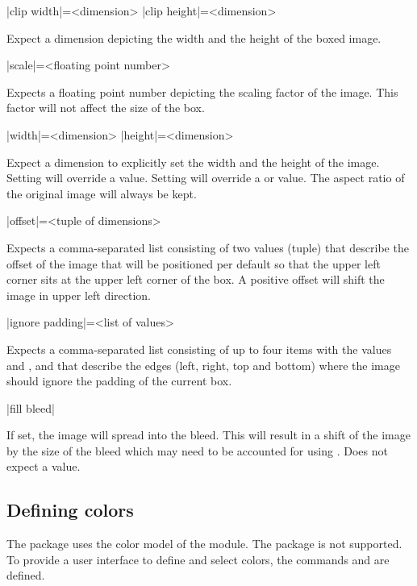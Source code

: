 \documentclass[a4paper]{article}
\begin{document}
\begin{macrodef}
|clip width|={<dimension>}
|clip height|={<dimension>}
\end{macrodef}
Expect a dimension depicting the width and the height of the boxed image.

\begin{macrodef}
|scale|={<floating point number>}
\end{macrodef}
Expects a floating point number depicting the scaling factor of the image. This factor will not affect the size of the box.

\begin{macrodef}
|width|={<dimension>}
|height|={<dimension>}
\end{macrodef}
Expect a dimension to explicitly set the width and the height of the image. Setting  will override a  value. Setting  will override a  or  value. The aspect ratio of the original image will always be kept.

\begin{macrodef}
|offset|={<tuple of dimensions>}
\end{macrodef}
Expects a comma-separated list consisting of two values (tuple) that describe the offset of the image that will be positioned per default so that the upper left corner sits at the upper left corner of the box. A positive offset will shift the image in upper left direction.

\begin{macrodef}
|ignore padding|={<list of values>}
\end{macrodef}
Expects a comma-separated list consisting of up to four items with the values  and ,  and  that describe the edges (left, right, top and bottom) where the image should ignore the padding of the current box.

\begin{macrodef}
|fill bleed|
\end{macrodef}
If set, the image will spread into the bleed. This will result in a shift of the image by the size of the bleed which may need to be accounted for using . Does not expect a value.

\subsection{Defining colors}

The package uses the color model of the  module. The  package is not supported. To provide a user interface to define and select colors, the commands \macro{\leporellocolordefine} and \macro{\leporellocolorselect} are defined. 
\end{document}
